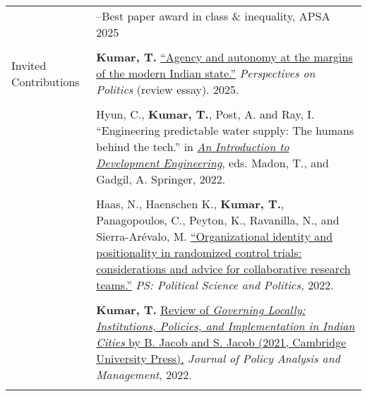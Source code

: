\documentclass[letterpaper, 10.5pt]{article}
\begin{document}
\begin{longtable}{p{1.5in}p{5in}}
&--\indent  Best paper award in class \& inequality, APSA 2025\\
& \\







{{Invited Contributions}} 

& \textbf{Kumar, T.} \href{https://doi.org/10.1017/S1537592725000714}{``Agency and autonomy at the margins of the modern Indian state.''} \textit{Perspectives on Politics} (review essay). 2025.\\
&\\
& Hyun, C., \textbf{Kumar, T.}, Post, A. and Ray, I. ``Engineering predictable water supply: The humans behind the tech.'' in \href{https://link.springer.com/book/10.1007/978-3-030-86065-3}{\textit{An Introduction to Development Engineering}}, eds. Madon, T., and Gadgil, A. Springer, 2022.\\

& \\

& Haas, N., Haenschen K., \textbf{Kumar, T.}, Panagopoulos, C., Peyton, K., Ravanilla, N., and Sierra-Ar\'{e}valo, M. \href{https://www.doi.org/10.1017/S1049096522000026}{``Organizational identity and positionality in randomized control trials: considerations and advice for collaborative research teams.''} \textit{PS: Political Science and Politics,} 2022. \\
& \\





& \textbf{Kumar, T.} \href{https://doi.org/10.1002/pam.22390}{Review of \textit{Governing Locally: Institutions, Policies, and Implementation in Indian Cities} by B. Jacob and S. Jacob (2021, Cambridge University Press).}  \textit{Journal of Policy Analysis and Management}, 2022. \\


& \\



\end{longtable}
\end{document}
